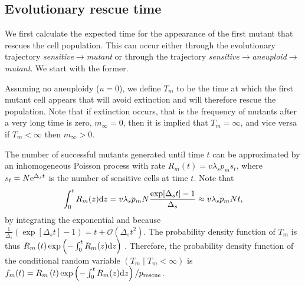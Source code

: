 \documentclass[12pt]{extarticle}
\renewcommand{\d}[1]{\ensuremath{\operatorname{d}\!{#1}}}
\renewcommand{\d}{{\rm d}}
\newcommand{\e}{{\rm e}}
\newcommand{\presc}{p_\text{rescue}}
\newcommand{\bigo}[1]{\mathcal{O}\left(#1\right)}
\begin{document}
\begin{appendices}
\section{Evolutionary rescue time}\label{sec:appendix_rescue_time}

We first calculate the expected time for the appearance of the first mutant that rescues the cell population.
This can occur either through the evolutionary trajectory \textit{sensitive}$\rightarrow$\textit{mutant} or through the trajectory \textit{sensitive}$\rightarrow$\textit{aneuploid}$\rightarrow$\textit{mutant}.
We start with the former. 

Assuming no aneuploidy ($u=0$), we define $T_m$ to be the time at which the first mutant cell appears that will avoid extinction and will therefore rescue the population.
Note that if extinction occurs, that is the frequency of mutants after a very long time is zero, $m_{\infty}=0$, then it is implied that $T_m=\infty$, and vice versa if $T_m<\infty$ then $m_{\infty}>0$.

The number of successful mutants generated until time $t$ can be approximated by an inhomogeneous Poisson process with rate $R_m\left(t\right) = v\lambda_s p_m s_t$, %
where $s_t=N\e^{\Delta_s t}$ is the number of sensitive cells at time $t$.
Note that 
\begin{equation}\label{eq:integralR}
\int_0^{t}{R_m(z)\d z} = 
v\lambda_s p_m N \frac{\exp[{\Delta_s t}]-1}{\Delta_s} \approx 
v\lambda_s p_m N t,
\end{equation}
by integrating the exponential and because $\frac{1}{\Delta_s} \left(\exp[\Delta_s t]-1\right) = t+ \bigo{\Delta_s t^2}$. %
The probability density function of $T_m$ is thus
$R_m\left(t\right)\exp\left(-\int_0^{t}{R_m(z)\d z}\right)$ \citep{allen2010introduction}. 
Therefore, the probability density function of the conditional random variable $(T_m \mid T_m < \infty)$ is
$f_m(t) = R_m \left(t\right)\exp\left(-\int_0^{t}{R_m(z)\d z}\right) / \presc$. 
\\


\end{appendices}
\end{document}
